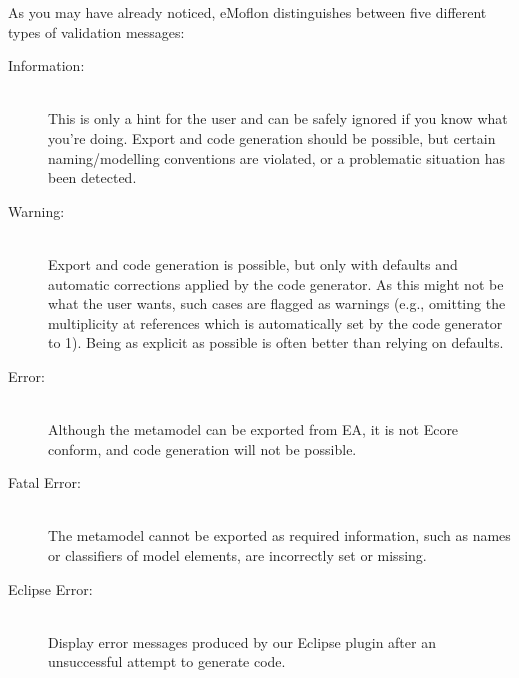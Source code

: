 As you may have already noticed, eMoflon distinguishes between five different types of validation messages:
\begin{description}
  \item[Information:]~\\
  This is only a hint for the user and can be safely ignored if you know what you're doing.
  Export and code generation should be possible, but certain naming/modelling conventions are violated, or a problematic situation has been detected.
  
  \item[Warning:]~\\ Export and code generation is possible, but only with defaults and automatic corrections applied by the code generator.
  As this might not be what the user wants, such cases are flagged as warnings (e.g., omitting the multiplicity at references which is automatically set by the
  code generator to 1).
  Being as explicit as possible is often better than relying on defaults.
  
  \item[Error:]~\\ Although the metamodel can be exported from EA, it is not Ecore conform, and code generation will not be possible.
 
  \item[Fatal Error:]~\\ The metamodel cannot be exported as required information, such as names or classifiers of model elements, are incorrectly set or
  missing.
  
  \item[Eclipse Error:]~\\ Display error messages produced by our Eclipse plugin after an unsuccessful attempt to generate code. 

\end{description}

